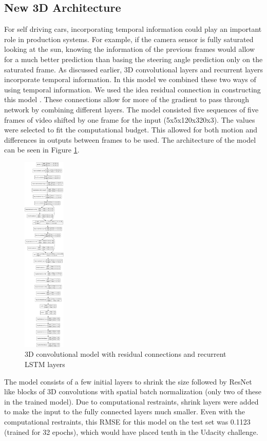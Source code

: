 \documentclass[10pt,twocolumn,letterpaper]{article}
\begin{document}
\subsection{New 3D Architecture}
For self driving cars, incorporating temporal information could play an important role in production systems. For example, if the camera sensor is fully saturated looking at the sun, knowing the information of the previous frames would allow for a much better prediction than basing the steering angle prediction only on the saturated frame. As discussed earlier, 3D convolutional layers and recurrent layers incorporate temporal information. In this model we combined these two ways of using temporal information. We used the idea residual connection in constructing this model \cite{he2016deep}. These connections allow for more of the gradient to pass through network by combining different layers. The model consisted five sequences of five frames of video shifted by one frame for the input (5x5x120x320x3). The values were selected to fit the computational budget. This allowed for both motion and differences in outputs between frames to be used. The architecture of the model can be seen in Figure \ref{3dconvlstm_graph}.

 \begin{figure}[!htb]
	\includegraphics[width=2cm]{3dlstmv2.png}
	\centering
	\caption{3D convolutional model with residual connections and recurrent LSTM layers}
	\label{3dconvlstm_graph}
\end{figure}

The model consists of a few initial layers to shrink the size followed by ResNet like blocks of 3D convolutions with spatial batch normalization (only two of these in the trained model). Due to computational restraints, shrink layers were added to make the input to the fully connected layers much smaller. Even with the computational restraints, this RMSE for this model on the test set was 0.1123 (trained for 32 epochs), which would have placed tenth in the Udacity challenge.
\end{document}
